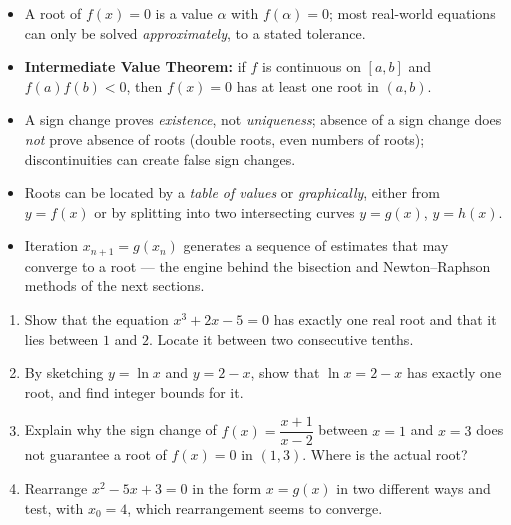 \documentclass[11pt]{article}
\newcommand{\cle}[1]{{\popxbold\color{popdark}#1}}
\begin{document}
\begin{aretenir}
\begin{itemize}
\item A \cle{root} of $f(x) = 0$ is a value $\alpha$ with $f(\alpha) = 0$; most real-world equations can only be solved \emph{approximately}, to a stated \cle{tolerance}.
\item \textbf{Intermediate Value Theorem:} if $f$ is continuous on $[a,b]$ and $f(a)f(b) < 0$, then $f(x) = 0$ has at least one root in $(a,b)$.
\item A sign change proves \emph{existence}, not \emph{uniqueness}; absence of a sign change does \emph{not} prove absence of roots (double roots, even numbers of roots); discontinuities can create false sign changes.
\item Roots can be located by a \emph{table of values} or \emph{graphically}, either from $y = f(x)$ or by splitting into two intersecting curves $y = g(x)$, $y = h(x)$.
\item Iteration $x_{n+1} = g(x_n)$ generates a sequence of estimates that may converge to a root — the engine behind the bisection and Newton--Raphson methods of the next sections.
\end{itemize}
\end{aretenir}

\begin{exercice}
\begin{enumerate}
\item Show that the equation $x^3 + 2x - 5 = 0$ has exactly one real root and that it lies between $1$ and $2$. Locate it between two consecutive tenths.
\item By sketching $y = \ln x$ and $y = 2 - x$, show that $\ln x = 2 - x$ has exactly one root, and find integer bounds for it.
\item Explain why the sign change of $f(x) = \dfrac{x+1}{x-2}$ between $x = 1$ and $x = 3$ does not guarantee a root of $f(x) = 0$ in $(1, 3)$. Where is the actual root?
\item Rearrange $x^2 - 5x + 3 = 0$ in the form $x = g(x)$ in two different ways and test, with $x_0 = 4$, which rearrangement seems to converge.
\end{enumerate}
\end{exercice}
\end{document}

